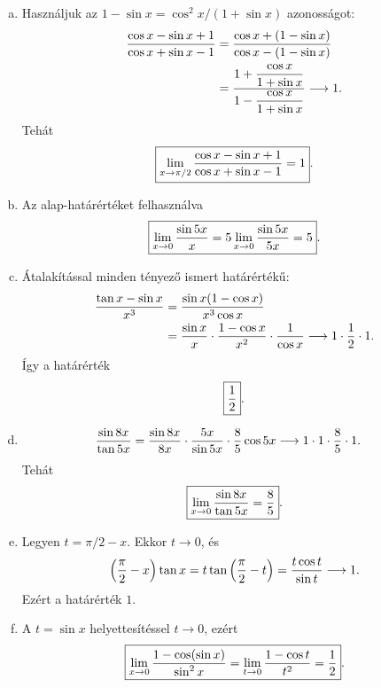 \documentclass{szb-solution}
\begin{document}
\begin{enumerate}[a)]
  \item Használjuk az $1-\sin x=\cos^2x/(1+\sin x)$ azonosságot:
        \begin{align*}
          \frac{\cos x-\sin x+1}{\cos x+\sin x-1}
          &=\frac{\cos x+(1-\sin x)}{\cos x-(1-\sin x)}\\
          &=\frac{1+\dfrac{\cos x}{1+\sin x}}
                  {1-\dfrac{\cos x}{1+\sin x}}
          \longrightarrow1
          \text.
        \end{align*}
        Tehát
        $$
          \boxed{\displaystyle
          \lim_{x\to\pi/2}\frac{\cos x-\sin x+1}
          {\cos x+\sin x-1}=1}
          \text.
        $$

  \item Az alap-határértéket felhasználva
        $$
          \boxed{\displaystyle
          \lim_{x\to0}\frac{\sin5x}{x}
          =5\lim_{x\to0}\frac{\sin5x}{5x}=5}
          \text.
        $$

  \item Átalakítással minden tényező ismert határértékű:
        \begin{align*}
          \frac{\tan x-\sin x}{x^3}
          &=\frac{\sin x(1-\cos x)}{x^3\cos x}\\
          &=\frac{\sin x}{x}\cdot
            \frac{1-\cos x}{x^2}\cdot\frac1{\cos x}
          \longrightarrow1\cdot\frac12\cdot1
          \text.
        \end{align*}
        Így a határérték
        $$
          \boxed{\frac12}
          \text.
        $$

  \item
        \begin{align*}
          \frac{\sin8x}{\tan5x}
          &=\frac{\sin8x}{8x}\cdot
            \frac{5x}{\sin5x}\cdot
            \frac85\cos5x
          \longrightarrow1\cdot1\cdot\frac85\cdot1
          \text.
        \end{align*}
        Tehát
        $$
          \boxed{\displaystyle\lim_{x\to0}\frac{\sin8x}{\tan5x}=\frac85}
          \text.
        $$

  \item Legyen $t=\pi/2-x$. Ekkor $t\to0$, és
        $$
          \left(\frac\pi2-x\right)\tan x
          =t\tan\left(\frac\pi2-t\right)
          =\frac{t\cos t}{\sin t}
          \longrightarrow1
          \text.
        $$
        Ezért a határérték $\boxed{1}$.

  \item A $t=\sin x$ helyettesítéssel $t\to0$, ezért
        $$
          \boxed{\displaystyle
          \lim_{x\to0}\frac{1-\cos(\sin x)}{\sin^2x}
          =\lim_{t\to0}\frac{1-\cos t}{t^2}=\frac12}
          \text.
        $$
\end{enumerate}
\end{document}
